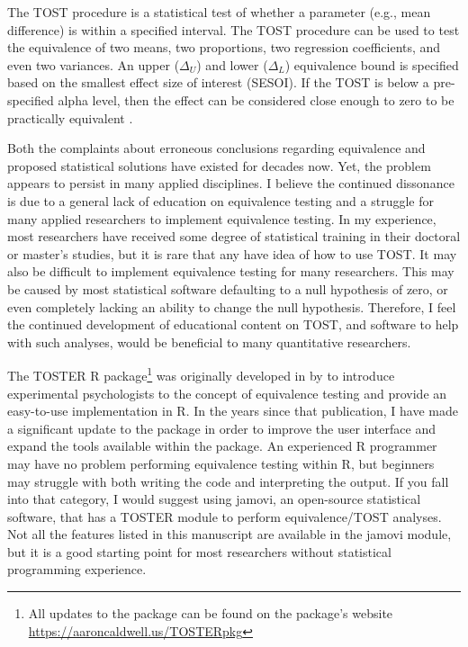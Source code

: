 \documentclass[]{interact}
\theoremstyle{plain}%
\theoremstyle{definition}
\theoremstyle{remark}
\begin{document}
The TOST procedure is a statistical test of whether a parameter (e.g.,
mean difference) is within a specified interval. The TOST procedure can
be used to test the equivalence of two means, two proportions, two
regression coefficients, and even two variances. An upper (\(\Delta_U\))
and lower (\(\Delta_L\)) equivalence bound is specified based on the
smallest effect size of interest (SESOI). If the TOST is below a
pre-specified alpha level, then the effect can be considered close
enough to zero to be practically equivalent \citep{lakens_ori}.

Both the complaints about erroneous conclusions regarding equivalence
\citep{blandaltman95} and proposed statistical solutions
\citep{schuirmann1987} have existed for decades now. Yet, the problem
appears to persist in many applied disciplines. I believe the continued
dissonance is due to a general lack of education on equivalence testing
and a struggle for many applied researchers to implement equivalence
testing. In my experience, most researchers have received some degree of
statistical training in their doctoral or master's studies, but it is
rare that any have idea of how to use TOST. It may also be difficult to
implement equivalence testing for many researchers. This may be caused
by most statistical software defaulting to a null hypothesis of zero, or
even completely lacking an ability to change the null hypothesis.
Therefore, I feel the continued development of educational content on
TOST, and software to help with such analyses, would be beneficial to
many quantitative researchers.

The TOSTER R package\footnote{All updates to the package can be found on
  the package's website \url{https://aaroncaldwell.us/TOSTERpkg}} was
originally developed in by \citet{lakens_ori} to introduce experimental
psychologists to the concept of equivalence testing and provide an
easy-to-use implementation in R. In the years since that publication, I
have made a significant update to the package in order to improve the
user interface and expand the tools available within the package. An
experienced R programmer may have no problem performing equivalence
testing within R, but beginners may struggle with both writing the code
and interpreting the output. If you fall into that category, I would
suggest using jamovi, an open-source statistical software, that has a
TOSTER module to perform equivalence/TOST analyses. Not all the features
listed in this manuscript are available in the jamovi module, but it is
a good starting point for most researchers without statistical
programming experience.
\end{document}
